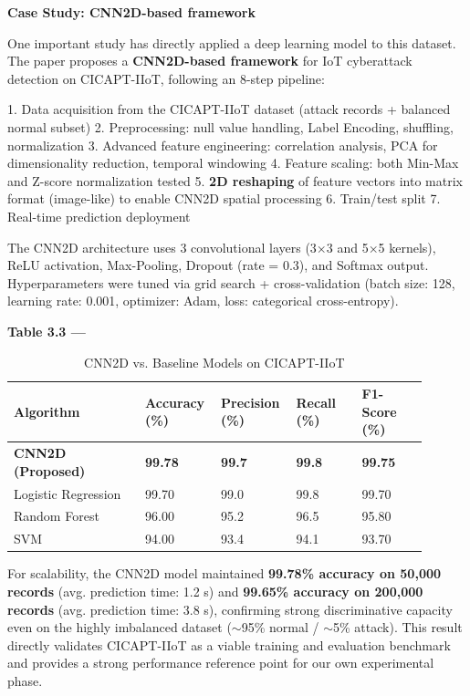\textbf{Case Study: CNN2D-based framework \cite{SharmilaD2026CNN2D}}

One important study \cite{SharmilaD2026CNN2D} has directly applied a deep learning model to this dataset. The paper proposes a \textbf{CNN2D-based framework} for IoT cyberattack detection on CICAPT-IIoT, following an 8-step pipeline:

1. Data acquisition from the CICAPT-IIoT dataset (attack records + balanced normal subset)
2. Preprocessing: null value handling, Label Encoding, shuffling, normalization
3. Advanced feature engineering: correlation analysis, PCA for dimensionality reduction, temporal windowing
4. Feature scaling: both Min-Max and Z-score normalization tested
5. \textbf{2D reshaping} of feature vectors into matrix format (image-like) to enable CNN2D spatial processing
6. Train/test split
7. Real-time prediction deployment

The CNN2D architecture uses 3 convolutional layers (3$\times$3 and 5$\times$5 kernels), ReLU activation, Max-Pooling, Dropout (rate = 0.3), and Softmax output. Hyperparameters were tuned via grid search + cross-validation (batch size: 128, learning rate: 0.001, optimizer: Adam, loss: categorical cross-entropy).

\textbf{Table 3.3 ---  \cite{ghiasvand2024cicapt}}

\begin{table}[H]
\centering
\caption{CNN2D vs. Baseline Models on CICAPT-IIoT}
\medskip
\begin{tabular}{|p{0.3\linewidth}|p{0.15\linewidth}|p{0.15\linewidth}|p{0.15\linewidth}|p{0.15\linewidth}|}
\hline
\textbf{Algorithm} & \textbf{Accuracy (\%)} & \textbf{Precision (\%)} & \textbf{Recall (\%)} & \textbf{F1-Score (\%)} \\
\hline
\textbf{CNN2D (Proposed)} & \textbf{99.78} & \textbf{99.7} & \textbf{99.8} & \textbf{99.75} \\
\hline
Logistic Regression & 99.70 & 99.0 & 99.8 & 99.70 \\
\hline
Random Forest & 96.00 & 95.2 & 96.5 & 95.80 \\
\hline
SVM & 94.00 & 93.4 & 94.1 & 93.70 \\
\hline
\end{tabular}
\end{table}

For scalability, the CNN2D model maintained \textbf{99.78\% accuracy on 50,000 records} (avg. prediction time: 1.2 s) and \textbf{99.65\% accuracy on 200,000 records} (avg. prediction time: 3.8 s), confirming strong discriminative capacity even on the highly imbalanced dataset ($\sim$95\% normal / $\sim$5\% attack). This result directly validates CICAPT-IIoT \cite{ghiasvand2024cicapt} as a viable training and evaluation benchmark and provides a strong performance reference point for our own experimental phase.

